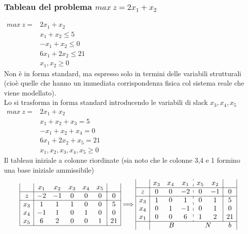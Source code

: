\documentclass[12pt,a4paper]{article}
\begin{document}
\subsubsection{Tableau del problema $max \ z = 2x_1+x_2$}
 $\begin{array}{rl}
max \ z = & 2x_1+x_2\\
 & x_1+x_2 \leq 5\\
 & -x_1 + x_2 \leq 0\\
 & 6x_1+2x_2 \leq 21\\
 & x_1,x_2 \geq 0
 \end{array}$\\
Non è in forma standard, ma espresso solo in termini delle variabili strutturali (cioè quelle che hanno un immediata corrispondenza fisica col sistema reale che viene modellato).\\
 Lo si trasforma in forma standard introducendo le variabili di slack $x_3,x_4, x_5$\\
 $\begin{array}{rl}
max \ z =  & 2x_1+x_2\\
 & x_1+x_2 +x_3 = 5\\
 & -x_1 + x_2 + x_4 = 0\\
 & 6x_1+2x_2 + x_5 = 21\\
 & x_1,x_2, x_3, x_4, x_5 \geq 0
 \end{array}$\\
 Il tableau iniziale a colonne riordinate (sia noto che le colonne 3,4 e 1 formino una base iniziale ammissibile)
\begin{equation*}
\begin{array}{|c|ccccc|c|}
& x_1 & x_2 & x_3 & x_4 & x_5 & \\ \hline
z & -2 & -1 & 0 & 0 & 0 & 0\\ \hline
x_3 & 1 & 1 & 1 & 0 & 0 & 5\\
x_4 & -1 & 1 & 0 & 1 & 0 & 0\\
x_5 & 6 & 2 & 0 & 0 &1 & 21\\ \hline
\end{array} 
\Longrightarrow 
\begin{array}{|c|ccc:cc|c|}
& x_3 & x_4 & x_1 & x_5 & x_2 & \\ \hline
z & 0 & 0 & -2 & 0 & -1 & 0\\ \hline
x_3 & 1 & 0 & 1 & 0 & 1 & 5\\
x_4 & 0 & 1 & -1 & 0 & 1 & 0\\
x_1 & 0 & 0 & 6 & 1 & 2 & 21\\ \hline
& \multicolumn{3}{c}{B} & \multicolumn{2}{c}{N} & b
\end{array}
\end{equation*}
 
\end{document}
